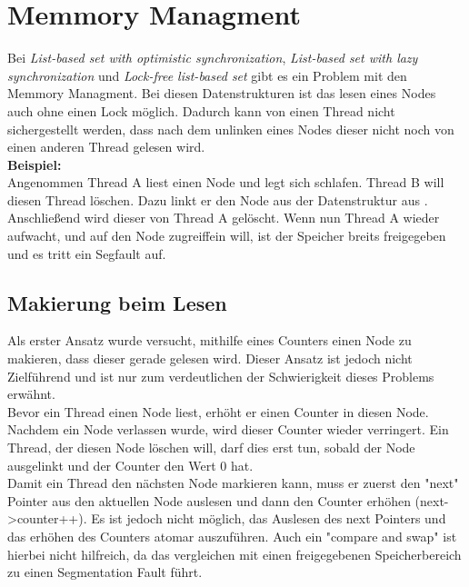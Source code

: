 \section{Memmory Managment}
Bei \textit{List-based set with optimistic synchronization}, \textit{List-based set with lazy synchronization} und \textit{Lock-free list-based set}
gibt es ein Problem mit den Memmory Managment. Bei diesen Datenstrukturen ist das lesen eines Nodes auch ohne einen Lock möglich. 
Dadurch kann von einen Thread nicht sichergestellt werden, dass nach dem unlinken eines Nodes dieser nicht noch von einen anderen Thread gelesen wird.
\\ 
\textbf{Beispiel:}
\\ Angenommen Thread A liest einen Node und legt sich schlafen. Thread B will diesen Thread löschen. Dazu linkt er den Node aus der Datenstruktur aus
. Anschließend wird dieser von Thread A gelöscht. Wenn nun Thread A wieder aufwacht, und auf den Node zugreiffein will, ist der Speicher breits freigegeben
und es tritt ein Segfault auf. 

\subsection{Makierung beim Lesen}
Als erster Ansatz wurde versucht, mithilfe eines Counters einen Node zu makieren, dass dieser gerade gelesen wird. Dieser Ansatz ist jedoch nicht 
Zielführend und ist nur zum verdeutlichen der Schwierigkeit dieses Problems erwähnt. \\
Bevor ein Thread einen Node liest, erhöht er einen Counter in diesen Node. Nachdem ein Node verlassen wurde, wird dieser Counter wieder verringert.
Ein Thread, der diesen Node löschen will, darf dies erst tun, sobald der Node ausgelinkt und der Counter den Wert 0 hat. \\
Damit ein Thread den nächsten Node markieren kann, muss er zuerst den "next" Pointer aus den aktuellen Node auslesen und dann den Counter erhöhen (next->counter++).
Es ist jedoch nicht möglich, das Auslesen des next Pointers und das erhöhen des Counters atomar auszuführen. Auch ein "compare and swap" ist hierbei nicht hilfreich,
da das vergleichen mit einen freigegebenen Speicherbereich zu einen Segmentation Fault führt. 


